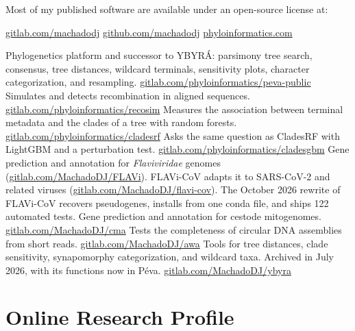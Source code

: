 \documentclass[11pt, letterpaper, sans]{moderncv}
\begin{document}
	\begin{flushleft}
		{Most of my published software are available under an open-source license at:}
	\end{flushleft}

		{\href{https://gitlab.com/MachadoDJ}{gitlab.com/machadodj}}
		{\href{https://github.com/machadodj}{github.com/machadodj}}
		{\href{https://phyloinformatics.com/resources/}{phyloinformatics.com}}

\vspace{0.5em}

		{\small Phylogenetics platform and successor to YBYRÁ: parsimony tree search, consensus, tree distances, wildcard terminals, sensitivity plots, character categorization, and resampling. \href{https://gitlab.com/phyloinformatics/peva-public}{gitlab.com/phyloinformatics/peva-public}}
		{\small Simulates and detects recombination in aligned sequences. \href{https://gitlab.com/phyloinformatics/recosim}{gitlab.com/phyloinformatics/recosim}}
		{\small Measures the association between terminal metadata and the clades of a tree with random forests. \href{https://gitlab.com/phyloinformatics/cladesrf}{gitlab.com/phyloinformatics/cladesrf}}
		{\small Asks the same question as CladesRF with LightGBM and a perturbation test. \href{https://gitlab.com/phyloinformatics/cladesgbm}{gitlab.com/phyloinformatics/cladesgbm}}
		{\small Gene prediction and annotation for \textit{Flaviviridae} genomes (\href{https://gitlab.com/MachadoDJ/FLAVi}{gitlab.com/MachadoDJ/FLAVi}). FLAVi-CoV adapts it to SARS-CoV-2 and related viruses (\href{https://gitlab.com/MachadoDJ/flavi-cov}{gitlab.com/MachadoDJ/flavi-cov}). The October 2026 rewrite of FLAVi-CoV recovers pseudogenes, installs from one conda file, and ships 122 automated tests.}
		{\small Gene prediction and annotation for cestode mitogenomes. \href{https://gitlab.com/MachadoDJ/cma}{gitlab.com/MachadoDJ/cma}}
		{\small Tests the completeness of circular DNA assemblies from short reads. \href{https://gitlab.com/MachadoDJ/awa}{gitlab.com/MachadoDJ/awa}}
		{\small Tools for tree distances, clade sensitivity, synapomorphy categorization, and wildcard taxa. Archived in July 2026, with its functions now in Péva. \href{https://gitlab.com/MachadoDJ/ybyra}{gitlab.com/MachadoDJ/ybyra}}

\section{Online Research Profile}
\end{document}
